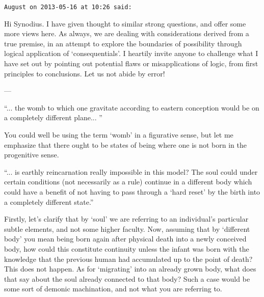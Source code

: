 \begin{footnotesize}
\begin{sffamily}
\hfill

\texttt{August on 2013-05-16 at 10:26 said:}

Hi Synodius. I have given thought to similar strong questions, and offer some more views here. As always, we are dealing with considerations derived from a true premise, in an attempt to explore the boundaries of possibility through logical application of `consequentials'. I heartily invite anyone to challenge what I have set out by pointing out potential flaws or misapplications of logic, from first principles to conclusions. Let us not abide by error!

---

``... the womb to which one gravitate according to eastern conception would be on a completely different plane... ''

You could well be using the term `womb' in a figurative sense, but let me emphasize that there ought to be states of being where one is not born in the progenitive sense.

``... is earthly reincarnation really impossible in this model? The soul could under certain conditions (not necessarily as a rule) continue in a different body which could have a benefit of not having to pass through a `hard reset' by the birth into a completely different state.''

Firstly, let's clarify that by `soul' we are referring to an individual's particular subtle elements, and not some higher faculty. Now, assuming that by `different body' you mean being born again after physical death into a newly conceived body, how could this constitute continuity unless the infant was born with the knowledge that the previous human had accumulated up to the point of death? This does not happen. As for `migrating' into an already grown body, what does that say about the soul already connected to that body? Such a case would be some sort of demonic machination, and not what you are referring to.


\end{sffamily}
\end{footnotesize}
